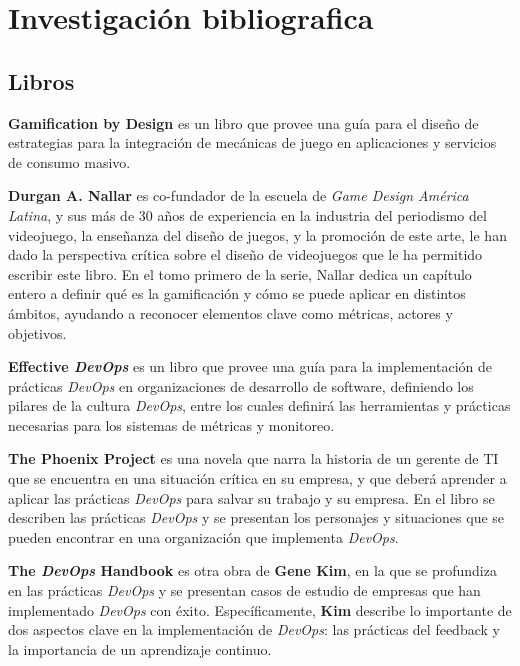 \documentclass[journal]{IEEEtran}
\begin{document}
\section{\textbf{\Large \textbf{\Large Investigación bibliografica}}}
\subsection{\textbf{ \textbf{\large Libros}}}

\cite{zichermann2011gamification} \textbf{Gamification by Design} es un libro que provee una guía para el diseño de estrategias para la integración de mecánicas de juego en aplicaciones y servicios de consumo masivo.

\cite{nallar2015estructuraludica} \textbf{Durgan A. Nallar} es co-fundador de la escuela de \textit{Game Design América Latina}, y sus más de 30 años de experiencia en la industria del periodismo del videojuego, la enseñanza del diseño de juegos, y la promoción de este arte, le han dado la perspectiva crítica sobre el diseño de videojuegos que le ha permitido escribir este libro. En el tomo primero de la serie, Nallar dedica un capítulo entero a definir qué es la gamificación y cómo se puede aplicar en distintos ámbitos, ayudando a reconocer elementos clave como métricas, actores y objetivos.

\cite{davis2016effective} \textbf{Effective \textit{DevOps}} es un libro que provee una guía para la implementación de prácticas \textit{DevOps} en organizaciones de desarrollo de software, definiendo los pilares de la cultura \textit{DevOps}, entre los cuales definirá las herramientas y prácticas necesarias para los sistemas de métricas y monitoreo.

\cite{kim2018phoenix} \textbf{The Phoenix Project} es una novela que narra la historia de un gerente de TI que se encuentra en una situación crítica en su empresa, y que deberá aprender a aplicar las prácticas \textit{DevOps} para salvar su trabajo y su empresa. En el libro se describen las prácticas \textit{DevOps} y se presentan los personajes y situaciones que se pueden encontrar en una organización que implementa \textit{DevOps}.

\cite{kim2021devops} \textbf{The \textit{DevOps} Handbook} es otra obra de \textbf{Gene Kim}, en la que se profundiza en las prácticas \textit{DevOps} y se presentan casos de estudio de empresas que han implementado \textit{DevOps} con éxito. Específicamente, \textbf{Kim} describe lo importante de dos aspectos clave en la implementación de \textit{DevOps}: las prácticas del feedback y la importancia de un aprendizaje continuo.
\end{document}
